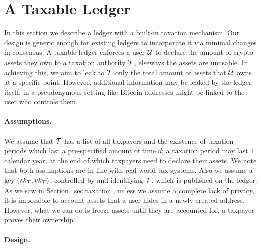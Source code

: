 \section{A Taxable Ledger}\label{sec:taxchain}

In this section we describe a ledger with a built-in taxation mechanism. Our
design is generic enough for existing ledgers to incorporate it via minimal
changes in consensus. A taxable ledger enforces a user $\user$ to declare the
amount of crypto-assets they own to a taxation authority $\taxAuth$, elseways
the assets are unusable. In achieving this, we aim to leak to $\taxAuth$ only
the total amount of assets that $\user$ owns at a specific point. However,
additional information may be leaked by the ledger itself, \eg in a
pseudonymous setting like Bitcoin addresses might be linked to the user who
controls them.

\paragraph{Assumptions.}

We assume that $\taxAuth$ has a list of all taxpayers and
the existence of taxation periods which last a pre-specified amount of time $d$;
\eg a taxation period may last $1$ calendar year, at the end of which taxpayers need
to declare their assets. We note that both assumptions are in line with
real-world tax systems. Also we assume a key $\keypair[\taxAuth]$, controlled by
and identifying $\taxAuth$, which is published on the ledger.  As we saw in
Section~\ref{sec:taxation}, unless we assume a complete lack of privacy, it is
impossible to account assets that a user hides in a newly-created address.
However, what we can do is freeze assets until they are accounted for, \ie a
taxpayer proves their ownership.

\paragraph{Design.}

